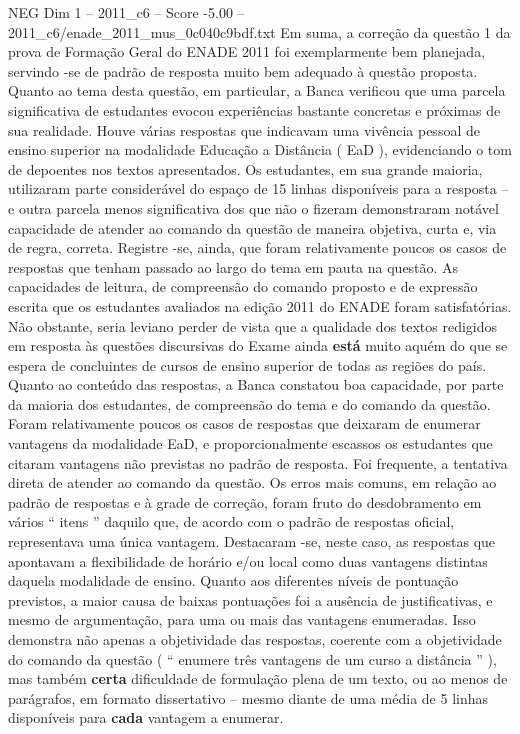 \begin{textsample}{NEG Dim 1 – 2011\_c6 – Score -5.00 – 2011\_c6/enade\_2011\_mus\_0c040c9bdf.txt}
Em suma, a correção da questão 1 da prova de Formação Geral do ENADE 2011 foi exemplarmente bem planejada, servindo -se de padrão de resposta muito bem adequado à questão proposta.
Quanto ao tema desta questão, em particular, a Banca verificou que uma parcela significativa de estudantes evocou experiências bastante concretas e próximas de sua realidade.
Houve várias respostas que indicavam uma vivência pessoal de ensino superior na modalidade Educação a Distância ( EaD ), evidenciando o tom de depoentes nos textos apresentados.
Os estudantes, em sua grande maioria, utilizaram parte considerável do espaço de 15 linhas disponíveis para a resposta – e outra parcela menos significativa dos que não o fizeram demonstraram notável capacidade de atender ao comando da questão de maneira objetiva, curta e, via de regra, correta.
Registre -se, ainda, que foram relativamente poucos os casos de respostas que tenham passado ao largo do tema em pauta na questão.
As capacidades de leitura, de compreensão do comando proposto e de expressão escrita que os estudantes avaliados na edição 2011 do ENADE foram satisfatórias.
Não obstante, seria leviano perder de vista que a qualidade dos textos redigidos em resposta às questões discursivas do Exame ainda \textbf{está} muito aquém do que se espera de concluintes de cursos de ensino superior de todas as regiões do país.
Quanto ao conteúdo das respostas, a Banca constatou boa capacidade, por parte da maioria dos estudantes, de compreensão do tema e do comando da questão.
Foram relativamente poucos os casos de respostas que deixaram de enumerar vantagens da modalidade EaD, e proporcionalmente escassos os estudantes que citaram vantagens não previstas no padrão de resposta.
Foi frequente, a tentativa direta de atender ao comando da questão.
Os erros mais comuns, em relação ao padrão de respostas e à grade de correção, foram fruto do desdobramento em vários “ itens ” daquilo que, de acordo com o padrão de respostas oficial, representava uma única vantagem.
Destacaram -se, neste caso, as respostas que apontavam a flexibilidade de horário e/ou local como duas vantagens distintas daquela modalidade de ensino.
Quanto aos diferentes níveis de pontuação previstos, a maior causa de baixas pontuações foi a ausência de justificativas, e mesmo de argumentação, para uma ou mais das vantagens enumeradas.
Isso demonstra não apenas a objetividade das respostas, coerente com a objetividade do comando da questão ( “ enumere três vantagens de um curso a distância ” ), mas também \textbf{certa} dificuldade de formulação plena de um texto, ou ao menos de parágrafos, em formato dissertativo – mesmo diante de uma média de 5 linhas disponíveis para \textbf{cada} vantagem a enumerar.

\end{textsample}
